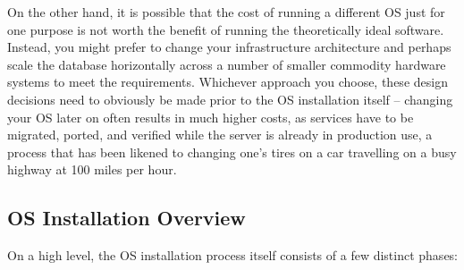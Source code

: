 On the other hand, it is possible that the cost of
running a different OS just for one purpose is not
worth the benefit of running the theoretically ideal
software.  Instead, you might prefer to change your
infrastructure architecture and perhaps scale the
database horizontally across a number of smaller
commodity hardware systems to meet the requirements.
Whichever approach you choose, these design decisions
need to obviously be made prior to the OS installation
itself -- changing your OS later on often results in
much higher costs, as services have to be migrated,
ported, and verified while the server is already in
production use, a process that has been likened to
changing one's tires on a car travelling on a busy
highway at 100 miles per hour.

\subsection{OS Installation Overview}
\label{software-installation:os-installation:overview}

On a high level, the OS installation process itself consists of a few
distinct phases:

